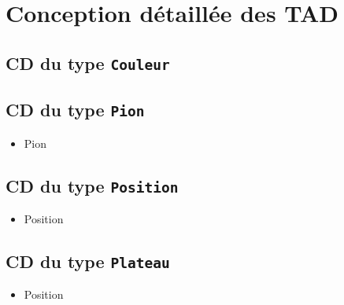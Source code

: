 
\chapter{Conception détaillée des TAD}

\section{CD du type \tt{Couleur}}
\begin{itemize}
\end{itemize}

\section{CD du type \tt{Pion}}
\begin{itemize}
\item
\begin{algorithme}
\begin{enregistrement}{Pion}
\end{enregistrement}
\end{algorithme}
\end{itemize}

\section{CD du type \tt{Position}}
\begin{itemize}
\item
\begin{algorithme}
\begin{enregistrement}{Position}
\end{enregistrement}
\end{algorithme}
\end{itemize}

\section{CD du type \tt{Plateau}}
\begin{itemize}
\item
\begin{algorithme}
\begin{enregistrement}{Position}
\end{enregistrement}
\end{algorithme}
\end{itemize}

